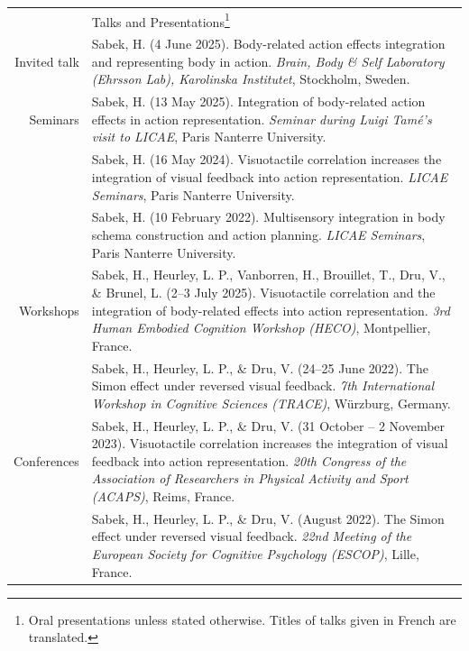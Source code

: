 \documentclass[a4paper, 11pt]{article}
\newcommand{\headingfont}{\Large\color{PineGreen}}
\newenvironment{SectionTable}[1]{
	\renewcommand*{\arraystretch}{1.1}
	\setlength{\tabcolsep}{8pt}
	\begin{longtable}{Rp{5.15in}} & #1 \\*}
{\end{longtable}\vspace{2pt}}
\begin{document}
\begin{SectionTable}{\headingfont Talks and Presentations\footnote{Oral presentations unless stated otherwise. Titles of talks given in French are translated.}}
	Invited talk &
	Sabek, H. (4 June 2025). Body-related action effects integration and representing body in action.
	\textit{Brain, Body \& Self Laboratory (Ehrsson Lab), Karolinska Institutet}, Stockholm, Sweden. \href{https://www.ehrssonlab.se/}{\faGlobe} \\

	Seminars &
	Sabek, H. (13 May 2025). Integration of body-related action effects in action representation.
	\textit{Seminar during Luigi Tamé's visit to LICAE}, Paris Nanterre University. \\

	&
	Sabek, H. (16 May 2024). Visuotactile correlation increases the integration of visual feedback into action representation.
	\textit{LICAE Seminars}, Paris Nanterre University. \href{https://licae.parisnanterre.fr/actualites/seminaires}{\faGlobe} \\

	&
	Sabek, H. (10 February 2022). Multisensory integration in body schema construction and action planning.
	\textit{LICAE Seminars}, Paris Nanterre University. \\

	Workshops &
	Sabek, H., Heurley, L. P., Vanborren, H., Brouillet, T., Dru, V., \& Brunel, L. (2--3 July 2025). Visuotactile correlation and the integration of body-related effects into action representation.
	\textit{3rd Human Embodied Cognition Workshop (HECO)}, Montpellier, France. \href{https://heco2025.sciencesconf.org/}{\faGlobe} \\

	&
	Sabek, H., Heurley, L. P., \& Dru, V. (24--25 June 2022). The Simon effect under reversed visual feedback.
	\textit{7th International Workshop in Cognitive Sciences (TRACE)}, Würzburg, Germany. \\

	Conferences &
	Sabek, H., Heurley, L. P., \& Dru, V. (31 October -- 2 November 2023). Visuotactile correlation increases the integration of visual feedback into action representation. \textit{20th Congress of the Association of Researchers in Physical Activity and Sport (ACAPS)}, Reims, France. \href{http://acaps2023.univ-reims.fr/programme/}{\faGlobe}\\

	&
	Sabek, H., Heurley, L. P., \& Dru, V. (August 2022). The Simon effect under reversed visual feedback.
	\textit{22nd Meeting of the European Society for Cognitive Psychology (ESCOP)}, Lille, France. \href{https://www.escop.eu/events/22nd-escop-conference}{\faGlobe} \\


\end{SectionTable}
\end{document}
